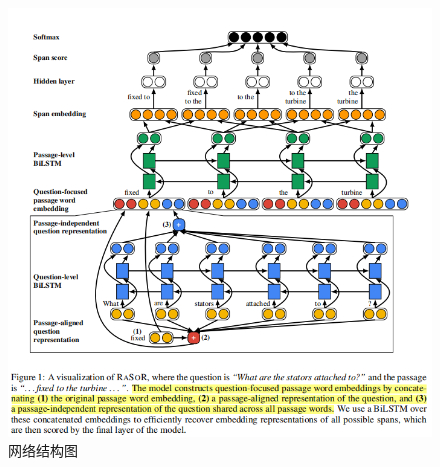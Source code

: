 \documentclass[a4paper,UTF8]{article}
\numberwithin{equation}{section}
\begin{document}
\begin{figure}[H]
    \centering
    \includegraphics[width=\textwidth]{9_1.png}
    \caption{网络结构图}
\end{figure}




\newpage
\end{document}
